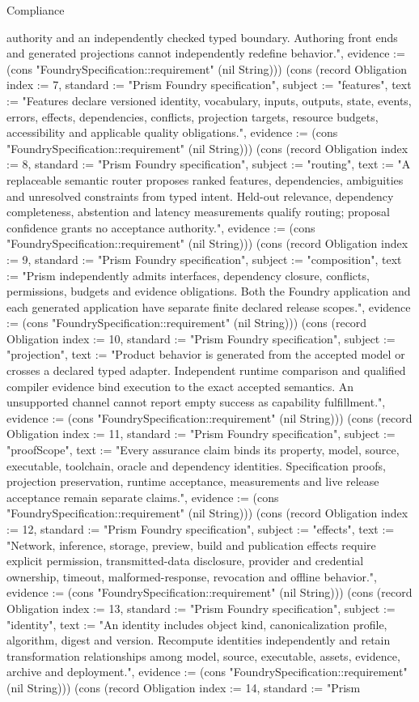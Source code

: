 \begin{lexlean}{Compliance}
\begin{semanticmodule}
{authority and an independently checked typed boundary. Authoring front ends and generated projections cannot independently redefine behavior.", evidence := (cons "FoundrySpecification::requirement" (nil String))}) (cons (record Obligation {index := 7, standard := "Prism Foundry specification", subject := "features", text := "Features declare versioned identity, vocabulary, inputs, outputs, state, events, errors, effects, dependencies, conflicts, projection targets, resource budgets, accessibility and applicable quality obligations.", evidence := (cons "FoundrySpecification::requirement" (nil String))}) (cons (record Obligation {index := 8, standard := "Prism Foundry specification", subject := "routing", text := "A replaceable semantic router proposes ranked features, dependencies, ambiguities and unresolved constraints from typed intent. Held-out relevance, dependency completeness, abstention and latency measurements qualify routing; proposal confidence grants no acceptance authority.", evidence := (cons "FoundrySpecification::requirement" (nil String))}) (cons (record Obligation {index := 9, standard := "Prism Foundry specification", subject := "composition", text := "Prism independently admits interfaces, dependency closure, conflicts, permissions, budgets and evidence obligations. Both the Foundry application and each generated application have separate finite declared release scopes.", evidence := (cons "FoundrySpecification::requirement" (nil String))}) (cons (record Obligation {index := 10, standard := "Prism Foundry specification", subject := "projection", text := "Product behavior is generated from the accepted model or crosses a declared typed adapter. Independent runtime comparison and qualified compiler evidence bind execution to the exact accepted semantics. An unsupported channel cannot report empty success as capability fulfillment.", evidence := (cons "FoundrySpecification::requirement" (nil String))}) (cons (record Obligation {index := 11, standard := "Prism Foundry specification", subject := "proofScope", text := "Every assurance claim binds its property, model, source, executable, toolchain, oracle and dependency identities. Specification proofs, projection preservation, runtime acceptance, measurements and live release acceptance remain separate claims.", evidence := (cons "FoundrySpecification::requirement" (nil String))}) (cons (record Obligation {index := 12, standard := "Prism Foundry specification", subject := "effects", text := "Network, inference, storage, preview, build and publication effects require explicit permission, transmitted-data disclosure, provider and credential ownership, timeout, malformed-response, revocation and offline behavior.", evidence := (cons "FoundrySpecification::requirement" (nil String))}) (cons (record Obligation {index := 13, standard := "Prism Foundry specification", subject := "identity", text := "An identity includes object kind, canonicalization profile, algorithm, digest and version. Recompute identities independently and retain transformation relationships among model, source, executable, assets, evidence, archive and deployment.", evidence := (cons "FoundrySpecification::requirement" (nil String))}) (cons (record Obligation {index := 14, standard := "Prism }
\end{semanticmodule}
\end{lexlean}
